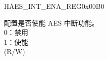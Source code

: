 \begin{register}{H}{AES\_INT\_ENA\_REG}{0x00B0}\label{regdesc:AESINTENAREG}
%
%
\regnewline%
\begin{regdesc}\begin{reglist}
\item [AES\_INT\_ENA] 配置是否使能 AES 中断功能。\\
0：禁用\\
1：使能\\
(R/W)
\end{reglist}\end{regdesc}
\end{register}
